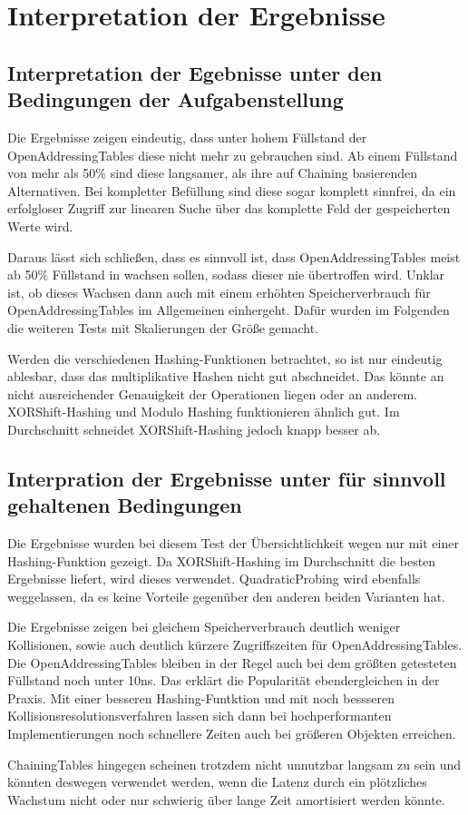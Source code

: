 \chapter{Interpretation der Ergebnisse}
\section{Interpretation der Egebnisse unter den Bedingungen der Aufgabenstellung}
Die Ergebnisse zeigen eindeutig, dass unter hohem Füllstand der OpenAddressingTables diese nicht mehr zu gebrauchen sind. Ab einem Füllstand von mehr als 50\% sind diese langsamer, als ihre auf Chaining basierenden Alternativen. Bei kompletter Befüllung sind diese sogar komplett sinnfrei, da ein erfolgloser Zugriff zur linearen Suche über das komplette Feld der gespeicherten Werte wird.

Daraus lässt sich schließen, dass es sinnvoll ist, dass OpenAddressingTables meist ab 50\% Füllstand in wachsen sollen, sodass dieser nie übertroffen wird. Unklar ist, ob dieses Wachsen dann auch mit einem erhöhten Speicherverbrauch für OpenAddressingTables im Allgemeinen einhergeht. Dafür wurden im Folgenden die weiteren Tests mit Skalierungen der Größe gemacht.

Werden die verschiedenen Hashing-Funktionen betrachtet, so ist nur eindeutig ablesbar, dass das multiplikative Hashen nicht gut abschneidet. Das könnte an nicht ausreichender Genauigkeit der Operationen liegen oder an anderem. XORShift-Hashing und Modulo Hashing funktionieren ähnlich gut. Im Durchschnitt schneidet XORShift-Hashing jedoch knapp besser ab.
\section{Interpration der Ergebnisse unter für sinnvoll gehaltenen Bedingungen}
Die Ergebnisse wurden bei diesem Test der Übersichtlichkeit wegen nur mit einer Hashing-Funktion gezeigt. Da XORShift-Hashing im Durchschnitt die besten Ergebnisse liefert, wird dieses verwendet. QuadraticProbing wird ebenfalls weggelassen, da es keine Vorteile gegenüber den anderen beiden Varianten hat.

Die Ergebnisse zeigen bei gleichem Speicherverbrauch deutlich weniger Kollisionen, sowie auch deutlich kürzere Zugriffszeiten für OpenAddressingTables. Die OpenAddressingTables bleiben in der Regel auch bei dem größten getesteten Füllstand noch unter 10ns. Das erklärt die Popularität ebendergleichen in der Praxis. Mit einer besseren Hashing-Funtktion und mit noch bessseren Kollisionsresolutionsverfahren lassen sich dann bei hochperformanten Implementierungen noch schnellere Zeiten auch bei größeren Objekten erreichen.

ChainingTables hingegen scheinen trotzdem nicht unnutzbar langsam zu sein und könnten deswegen verwendet werden, wenn die Latenz durch ein plötzliches Wachstum nicht oder nur schwierig über lange Zeit amortisiert werden könnte.